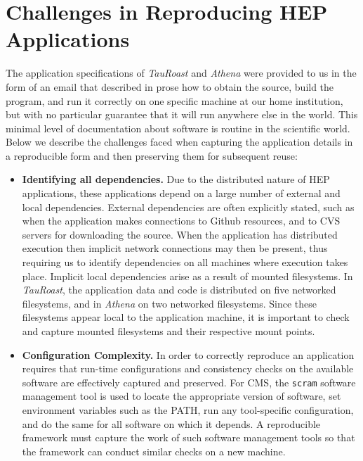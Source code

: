 \section{Challenges in Reproducing HEP Applications}

The application specifications of \emph{TauRoast} and \emph{Athena} were provided to us in the form of an
email that described in prose how to obtain the source,
build the program, and run it correctly on one specific
machine at our home institution, but with no particular guarantee that
it will run anywhere else in the world. This minimal level of documentation about software is routine in the scientific world. 
Below we describe the challenges faced when capturing the application details in a reproducible form and then preserving them for subsequent reuse:

\begin{itemize}

\item {\bf Identifying all dependencies.}  Due to the distributed nature of HEP applications, these applications depend on a large number of external and local dependencies.
External dependencies are often explicitly stated, such as when the application makes connections to Github resources, and to CVS servers for downloading the source. 
When the application has distributed execution then implicit network connections may then be present, thus requiring us to identify dependencies on all machines where execution takes place. 
Implicit local dependencies arise as a result of mounted filesystems. In \emph{TauRoast}, the application data and code is distributed on five networked filesystems, and in \emph{Athena} on two networked filesystems. 
Since these filesystems appear local to the application machine, it is important to check and capture mounted filesystems and their respective mount points. 

\item {\bf Configuration Complexity.} In order to correctly reproduce an application requires that run-time configurations and consistency checks on the available software are effectively captured and preserved. 
For CMS,  the {\tt scram} software management tool is used to locate
the appropriate version of software,  set environment variables such as the PATH, run any
tool-specific configuration, and do the same for all software on which it depends. A reproducible framework must capture the work of such software management tools so that the framework can conduct similar
checks on a new machine. 


\end{itemize}
